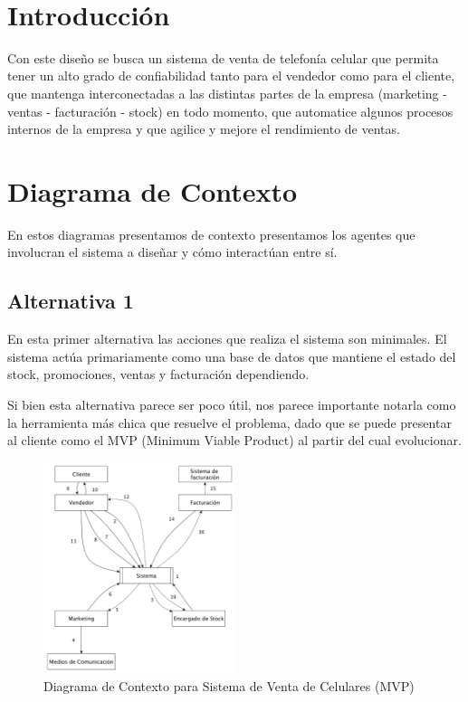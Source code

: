 ‌\section{Introducción}
Con este diseño se busca un sistema de venta de telefonía celular que permita tener un alto grado de confiabilidad tanto para el vendedor como para el cliente, que mantenga interconectadas a las distintas partes de la empresa (marketing - ventas - facturación - stock) en todo momento, que automatice algunos procesos internos de la empresa y que agilice y mejore el rendimiento de ventas.\\

\section{Diagrama de Contexto}

En estos diagramas presentamos de contexto presentamos los agentes que 
involucran el sistema a diseñar y cómo interactúan entre sí.

\subsection{Alternativa 1}

En esta primer alternativa las acciones que realiza el sistema son minimales. El 
sistema actúa primariamente como una base de datos que mantiene el estado del 
stock, promociones, ventas y facturación dependiendo.

Si bien esta alternativa parece ser poco útil, nos parece importante notarla 
como la herramienta más chica que resuelve el problema, dado que se puede presentar 
al cliente como el MVP (Minimum Viable Product) al partir del cual evolucionar.

\begin{figure}[h!]
  \centering
  \includegraphics[width=0.5\textwidth]{./imagenes/contexto_2.pdf}
  \caption{Diagrama de Contexto para Sistema de Venta de Celulares (MVP)}
\end{figure}

